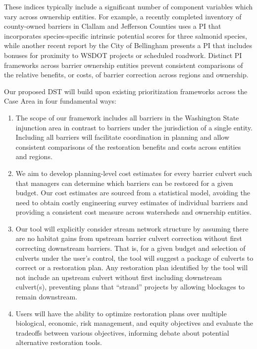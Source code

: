 \documentclass[12pt]{elsarticle}
\begin{document}
These indices typically include a significant number of component variables which vary across ownership entities. For example, a recently completed inventory of county-owned barriers in Clallam and Jefferson Counties uses a PI that incorporates species-specific intrinsic potential scores for three salmonid species, while another recent report by the City of Bellingham presents a PI that includes bonuses for proximity to WSDOT projects or scheduled roadwork. Distinct PI frameworks across barrier ownership entities prevent consistent comparisons of the relative benefits, or costs, of barrier correction across regions and ownership. 

Our proposed DST will build upon existing prioritization frameworks across the Case Area in four fundamental ways: 

\begin{enumerate}
\item The scope of our framework includes all barriers in the Washington State injunction area in contrast to barriers under the jurisdiction of a single entity. Including all barriers will facilitate coordination in planning and allow consistent comparisons of the restoration benefits and costs across entities and regions. 
\item We aim to develop planning-level cost estimates for every barrier culvert such that managers can determine which barriers can be restored for a given budget. Our cost estimates are sourced from a statistical model, avoiding the need to obtain costly engineering survey estimates of individual barriers and providing a consistent cost measure across watersheds and ownership entities. 
\item Our tool will explicitly consider stream network structure by assuming there are no habitat gains from upstream barrier culvert correction without first correcting downstream barriers. That is, for a given budget and selection of culverts under the user's control, the tool will suggest a package of culverts to correct or a restoration plan. Any restoration plan identified by the tool will not include an upstream culvert without first including downstream culvert(s), preventing plans that ``strand'' projects by allowing blockages to remain downstream. 
\item Users will have the ability to optimize restoration plans over multiple biological, economic, risk management, and equity objectives and evaluate the tradeoffs between various objectives, informing debate about potential alternative restoration tools. 
\end{enumerate}
\end{document}
